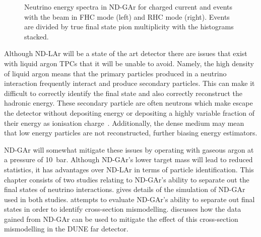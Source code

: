 \begin{figure}[h]
	\begin{minipage}[t]{.5\linewidth}
		\begin{adjustbox}{max totalsize=\linewidth, center}
				
		\end{adjustbox}
	\end{minipage}
	\hfill
	\begin{minipage}[t]{.5\linewidth}
		\begin{adjustbox}{max totalsize=\linewidth, center}
				
		\end{adjustbox}
	\end{minipage}
	\caption[Neutrino energy spectrum in ND-GAr divided by pion multiplicity.]{Neutrino energy spectra in ND-GAr for charged current \numu and \anumu events with the beam in FHC mode (left) and RHC mode (right). Events are divided by true final state pion multiplicity with the histograms stacked.}
	\label{fig:energyByMode}
\end{figure}

Although ND-LAr will be a state of the art detector there are issues that exist with liquid argon TPCs that it will be unable to avoid.
Namely, the high density of liquid argon means that the primary particles produced in a neutrino interaction frequently interact and produce secondary particles.
This can make it difficult to correctly identify the final state and also correctly reconstruct the hadronic energy.
These secondary particle are often neutrons which make escape the detector without depositing energy or depositing a highly variable fraction of their energy as ionisation charge~\cite{Friedland_2019}.
Additionally, the dense medium may mean that low energy particles are not reconstructed, further biasing energy estimators.

ND-GAr will somewhat mitigate these issues by operating with gaseous argon at a pressure of 10~bar.
Although ND-GAr's lower target mass will lead to reduced statistics, it has advantages over ND-LAr in terms of particle identification.
This chapter consists of two studies relating to ND-GAr's ability to separate out the final states of neutrino interactions.
 gives details of the simulation of ND-GAr used in both studies.
 attempts to evaluate ND-GAr's ability to separate out final states in order to identify cross-section mismodelling.
 discusses how the data gained from ND-GAr can be used to mitigate the effect of this cross-section mismodelling in the DUNE far detector.

